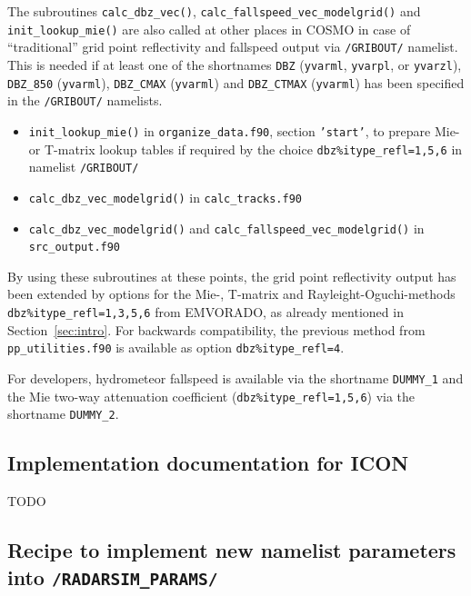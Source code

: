 \documentclass[10pt,a4paper,twoside,headinclude,footinclude,parskip=half]{scrartcl}
\newcommand{\myaktuellesection}{sec:intro}%
\newcommand{\labelsec}[1]{\label{#1}\renewcommand{\myaktuellesection}{#1}}%
\newcommand{\labelsec}[1]{\label{#1}}%
\newcommand{\srcform}[1]{\mbox{\texttt{#1}}\xspace}%
\begin{document}
The subroutines \srcform{calc_dbz_vec()}, \srcform{calc_fallspeed_vec_modelgrid()} and \srcform{init_lookup_mie()}
are also called at other places in COSMO in case of ``traditional'' grid point reflectivity and fallspeed output via \srcform{/GRIBOUT/} namelist.
This is needed if at least one of the shortnames \srcform{DBZ} (\srcform{yvarml}, \srcform{yvarpl}, or \srcform{yvarzl}), \srcform{DBZ_850} (\srcform{yvarml}), \srcform{DBZ_CMAX} (\srcform{yvarml}) and \srcform{DBZ_CTMAX} (\srcform{yvarml}) has been specified in the \srcform{/GRIBOUT/} namelists.
\begin{itemize}
\item \srcform{init_lookup_mie()} in \srcform{organize_data.f90}, section \srcform{'start'}, to prepare Mie- or T-matrix lookup tables if required by
  the choice \srcform{dbz\%itype_refl=1,5,6} in namelist \srcform{/GRIBOUT/}
\item \srcform{calc_dbz_vec_modelgrid()} in \srcform{calc_tracks.f90}
\item \srcform{calc_dbz_vec_modelgrid()} and \srcform{calc_fallspeed_vec_modelgrid()} in \srcform{src_output.f90}
\end{itemize}
By using these subroutines at these points, the grid point reflectivity output
has been extended by options for the Mie-, T-matrix and Rayleight-Oguchi-methods \srcform{dbz\%itype_refl=1,3,5,6} from EMVORADO, as already
mentioned in Section~\ref{sec:intro}.
For backwards compatibility, the previous method from \srcform{pp_utilities.f90}
is available as option \srcform{dbz\%itype_refl=4}.

For developers, hydrometeor fallspeed is available via the shortname \srcform{DUMMY_1} and the Mie two-way attenuation coefficient (\srcform{dbz\%itype_refl=1,5,6})
via the shortname \srcform{DUMMY_2}.


\subsection{Implementation documentation for ICON}

\labelsec{sec:implicon}

TODO

\subsection{Recipe to implement new namelist parameters into \srcform{/RADARSIM_PARAMS/}}

\labelsec{sec:devel:newnml}
\end{document}
